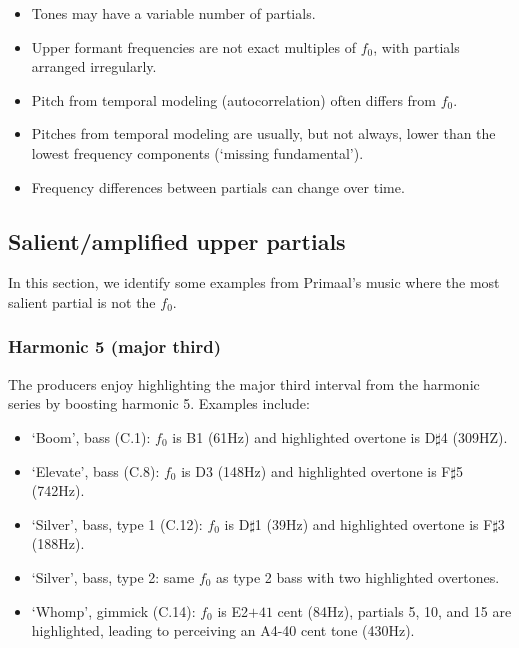 \documentclass{article}
\begin{document}
\begin{itemize}[noitemsep]
    \item Tones may have a variable number of partials.
    \item Upper formant frequencies are not exact multiples of $f_0$, with partials arranged irregularly.
    \item Pitch from temporal modeling (autocorrelation) often differs from $f_0$.
    \item Pitches from temporal modeling are usually, but not always, lower than the lowest frequency components (`missing fundamental').
    \item Frequency differences between partials can change over time.
\end{itemize}

\subsection{Salient/amplified upper partials}\label{sec:examplesofboostedpartials}

In this section, we identify some examples from Primaal's music where the most salient partial is not the $f_0$.

\subsubsection{Harmonic 5 (major third)}\label{sec:harmonic5}

The producers enjoy highlighting the major third interval from the harmonic series by boosting harmonic 5. Examples include:

\begin{itemize}[noitemsep]
    \item `Boom', bass (C.1): $f_0$ is B1 (61Hz) and highlighted overtone is D$\sharp$4 (309HZ).
    \item `Elevate', bass (C.8): $f_0$ is D3 (148Hz) and highlighted overtone is F$\sharp$5 (742Hz).
    \item `Silver', bass, type 1 (C.12): $f_0$ is D$\sharp$1 (39Hz) and highlighted overtone is F$\sharp$3 (188Hz).
    \item `Silver', bass, type 2: same $f_0$ as type 2 bass with two highlighted overtones.
    \item `Whomp', gimmick (C.14): $f_0$ is E2$+41$ cent (84Hz), partials 5, 10, and 15 are highlighted, leading to perceiving an A4-40 cent tone (430Hz).
\end{itemize}
\end{document}
